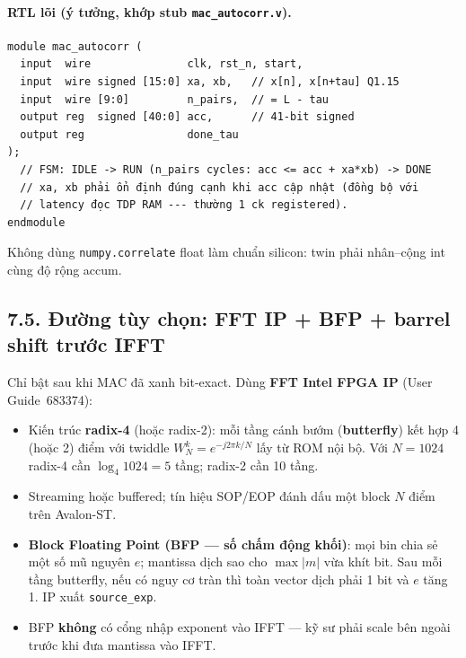 \paragraph{RTL lõi (ý tưởng, khớp stub \texttt{mac\_autocorr.v}).}
\begin{verbatim}
module mac_autocorr (
  input  wire               clk, rst_n, start,
  input  wire signed [15:0] xa, xb,   // x[n], x[n+tau] Q1.15
  input  wire [9:0]         n_pairs,  // = L - tau
  output reg  signed [40:0] acc,      // 41-bit signed
  output reg                done_tau
);
  // FSM: IDLE -> RUN (n_pairs cycles: acc <= acc + xa*xb) -> DONE
  // xa, xb phải ổn định đúng cạnh khi acc cập nhật (đồng bộ với
  // latency đọc TDP RAM --- thường 1 ck registered).
endmodule
\end{verbatim}
Không dùng \texttt{numpy.correlate} float làm chuẩn silicon: twin phải nhân--cộng int cùng độ rộng accum.

\subsection*{7.5. Đường tùy chọn: FFT IP + BFP + barrel shift trước IFFT}

Chỉ bật sau khi MAC đã xanh bit-exact. Dùng \textbf{FFT Intel FPGA IP} (User Guide~683374):

\begin{itemize}[leftmargin=1.4em]
\item Kiến trúc \textbf{radix-4} (hoặc radix-2): mỗi tầng cánh bướm (\textbf{butterfly}) kết hợp 4 (hoặc 2) điểm với twiddle $W_N^k = e^{-j2\pi k/N}$ lấy từ ROM nội bộ. Với $N=1024$ radix-4 cần $\log_4 1024 = 5$ tầng; radix-2 cần 10 tầng.
\item Streaming hoặc buffered; tín hiệu SOP/EOP đánh dấu một block $N$ điểm trên Avalon-ST.
\item \textbf{Block Floating Point (BFP --- số chấm động khối)}: mọi bin chia sẻ một số mũ nguyên $e$; mantissa dịch sao cho $\max|m|$ vừa khít bit. Sau mỗi tầng butterfly, nếu có nguy cơ tràn thì toàn vector dịch phải 1 bit và $e$ tăng 1. IP xuất \texttt{source\_exp}.
\item BFP \textbf{không} có cổng nhập exponent vào IFFT --- kỹ sư phải scale bên ngoài trước khi đưa mantissa vào IFFT.
\end{itemize}

